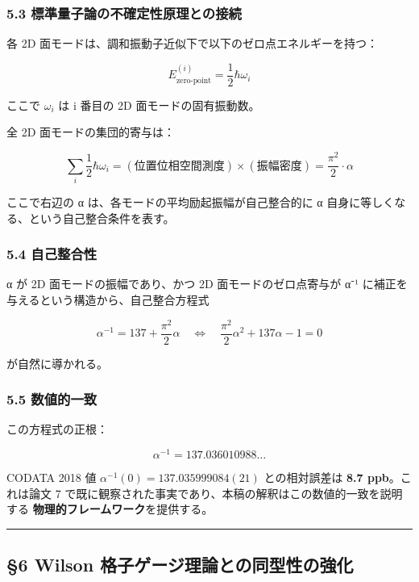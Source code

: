 \documentclass[
  11pt]{ltjsarticle}
\begin{document}
\subsubsection{5.3
標準量子論の不確定性原理との接続}\label{ux6a19ux6e96ux91cfux5b50ux8ad6ux306eux4e0dux78baux5b9aux6027ux539fux7406ux3068ux306eux63a5ux7d9a}

各 2D 面モードは、調和振動子近似下で以下のゼロ点エネルギーを持つ：

\[E_{\text{zero-point}}^{(i)} = \frac{1}{2}\hbar\omega_i\]

ここで \(\omega_i\) は i 番目の 2D 面モードの固有振動数。

全 2D 面モードの集団的寄与は：

\[\sum_i \frac{1}{2}\hbar\omega_i = (\text{位置位相空間測度}) \times (\text{振幅密度}) = \frac{\pi^2}{2} \cdot \alpha\]

ここで右辺の α は、各モードの平均励起振幅が自己整合的に α
自身に等しくなる、という自己整合条件を表す。

\subsubsection{5.4 自己整合性}\label{ux81eaux5df1ux6574ux5408ux6027}

α が 2D 面モードの振幅であり、かつ 2D 面モードのゼロ点寄与が α⁻¹
に補正を与えるという構造から、自己整合方程式

\[\alpha^{-1} = 137 + \frac{\pi^2}{2}\alpha \quad \Leftrightarrow \quad \frac{\pi^2}{2}\alpha^2 + 137\alpha - 1 = 0\]

が自然に導かれる。

\subsubsection{5.5 数値的一致}\label{ux6570ux5024ux7684ux4e00ux81f4}

この方程式の正根：

\[\alpha^{-1} = 137.036010988\ldots\]

CODATA 2018 値 \(\alpha^{-1}(0) = 137.035999084(21)\) との相対誤差は
\textbf{8.7 ppb}。これは論文 7
で既に観察された事実であり、本稿の解釈はこの数値的一致を説明する
\textbf{物理的フレームワーク}を提供する。

\begin{center}\rule{0.5\linewidth}{0.5pt}\end{center}

\subsection{§6 Wilson
格子ゲージ理論との同型性の強化}\label{wilson-ux683cux5b50ux30b2ux30fcux30b8ux7406ux8ad6ux3068ux306eux540cux578bux6027ux306eux5f37ux5316}
\end{document}
